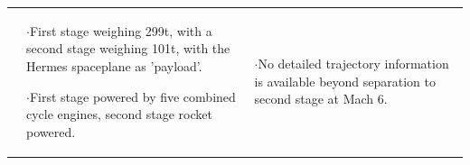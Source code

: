 {\begin{landscape}
\begin{xltabular}{\linewidth}{|X|X|X|}
	
	&\small
{}

$\cdot$First stage weighing 299t, with a second stage weighing 101t, with the Hermes spaceplane as 'payload'. 

$\cdot$First stage powered by five combined cycle engines, second stage rocket powered. 
	
	&\small
	$\cdot$No detailed trajectory information is available beyond separation to second stage at Mach 6. 
	

\end{xltabular}
\end{landscape}}
